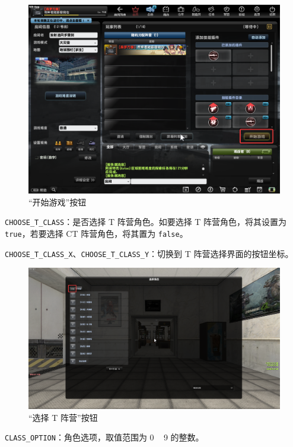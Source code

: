 \begin{figure}[H]
    \Centering
    \includegraphics[width=\textwidth]{docs/assets/start_game.png}
    \caption{“开始游戏”按钮}
\end{figure}

\lstinline{CHOOSE_T_CLASS}：是否选择 T 阵营角色。如要选择 T 阵营角色，将其设置为 \lstinline{true}，若要选择 CT 阵营角色，将其置为 \lstinline{false}。

\lstinline{CHOOSE_T_CLASS_X}、\lstinline{CHOOSE_T_CLASS_Y}：切换到 T 阵营选择界面的按钮坐标。

\begin{figure}[H]
    \Centering
    \includegraphics[width=\textwidth]{docs/assets/choose_T_class.png}
    \caption{“选择 T 阵营”按钮}
\end{figure}

\lstinline{CLASS_OPTION}：角色选项，取值范围为 0 ~ 9 的整数。

